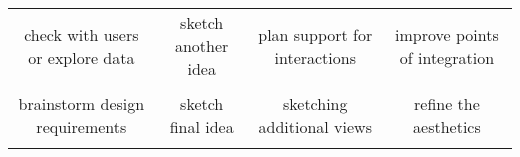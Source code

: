 {\begin{longtable}[]{cccc}
\begin{minipage}[t]{0.21\columnwidth}
check with users or explore data\strut
\end{minipage} & \begin{minipage}[t]{0.21\columnwidth}\raggedright\strut
sketch another idea\strut
\end{minipage} & \begin{minipage}[t]{0.21\columnwidth}\raggedright\strut
plan support for interactions\strut
\end{minipage} & \begin{minipage}[t]{0.21\columnwidth}\raggedright\strut
improve points of integration\strut
\end{minipage}\tabularnewline
\begin{minipage}[t]{0.21\columnwidth}\raggedright\strut
\strut
\end{minipage} & \begin{minipage}[t]{0.21\columnwidth}\raggedright\strut
\strut
\end{minipage} & \begin{minipage}[t]{0.21\columnwidth}\raggedright\strut
\strut
\end{minipage} & \begin{minipage}[t]{0.21\columnwidth}\raggedright\strut
\strut
\end{minipage}\tabularnewline
\begin{minipage}[t]{0.21\columnwidth}\raggedright\strut
brainstorm design requirements\strut
\end{minipage} & \begin{minipage}[t]{0.21\columnwidth}\raggedright\strut
sketch final idea\strut
\end{minipage} & \begin{minipage}[t]{0.21\columnwidth}\raggedright\strut
sketching additional views\strut
\end{minipage} & \begin{minipage}[t]{0.21\columnwidth}\raggedright\strut
refine the aesthetics\strut
\end{minipage}\tabularnewline
\begin{minipage}[t]{0.21\columnwidth}\raggedright\strut
\strut
\end{minipage} & \begin{minipage}[t]{0.21\columnwidth}\raggedright\strut
\strut
\end{minipage} & \begin{minipage}[t]{0.21\columnwidth}\raggedright\strut
\strut
\end{minipage} & \begin{minipage}[t]{0.21\columnwidth}\raggedright\strut

\end{minipage}
\end{longtable}}
